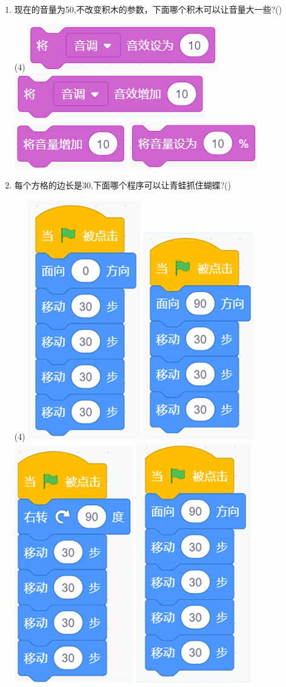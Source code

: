 \documentclass[10.5pt, a4paper]{article}
\begin{document}
\begin{enumerate}
        \item 现在的音量为50,不改变积木的参数，下面哪个积木可以让音量大一些?(\qquad)
        \begin{tasks}(4)
            \task \includegraphics[width=.15\textwidth]{11a.png}
            \task \includegraphics[width=.15\textwidth]{11b.png}
            \task \includegraphics[width=.1\textwidth]{11c.png}
            \task \includegraphics[width=.12\textwidth]{11d.png}
        \end{tasks}

        \item 每个方格的边长是30,下面哪个程序可以让青蛙抓住蝴蝶?(\qquad)
        \begin{tasks}(4)
            \task \includegraphics[width=.1\textwidth]{12a.png}
            \task \includegraphics[width=.1\textwidth]{12b.png}
            \task \includegraphics[width=.1\textwidth]{12c.png}
            \task \includegraphics[width=.1\textwidth]{12d.png}
        \end{tasks}
        

\end{enumerate}
\end{document}
